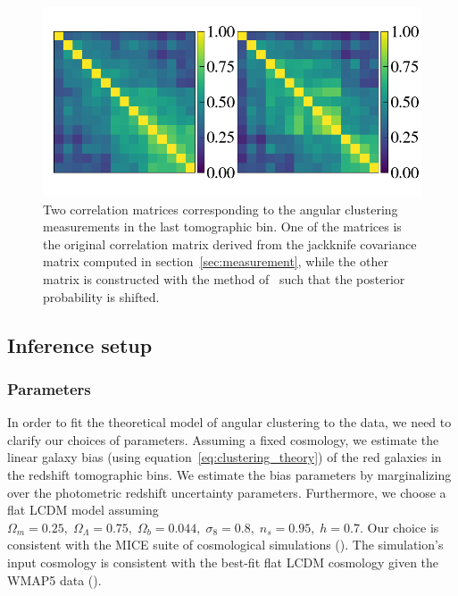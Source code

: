 \documentclass{aa}
\numberwithin{equation}{section}
\begin{document}
\begin{figure}
\includegraphics[width=\textwidth]{figures_tmp/correlation_last_bin_cosmo.png}
\caption{ Two correlation matrices corresponding to the angular clustering measurements in the last tomographic bin. One of the matrices is the original correlation matrix derived from the jackknife covariance matrix computed in section~\ref{sec:measurement}, while the other matrix is constructed with the method of~\citet{sellentin2019} such that the posterior probability is shifted.} 
\label{fig:blind}
\end{figure}

\subsection{Inference setup}\label{sec:inference}

\subsubsection{Parameters}

In order to fit the theoretical model of angular clustering to the data, we need to clarify our choices of parameters. Assuming a fixed cosmology, we estimate the linear galaxy bias (using equation~\ref{eq:clustering_theory}) of the red galaxies in the redshift tomographic bins. We estimate the bias parameters by marginalizing over the photometric redshift uncertainty parameters.  
Furthermore, we choose a flat LCDM model assuming $\Omega_m = 0.25, \;\Omega_{\Lambda} = 0.75, \; \Omega_b = 0.044, \; \sigma_{8} = 0.8, \; n_s = 0.95, \; h = 0.7$. Our choice is consistent with the MICE suite of cosmological simulations (\citealt{MICE1}). The simulation's input cosmology is consistent with the best-fit flat LCDM cosmology given the WMAP5 data (\citealt{WMAP5}). 

\end{document}
